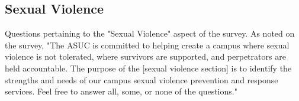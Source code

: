 \documentclass{article}\usepackage[]{graphicx}\usepackage[]{color}
\begin{document}
\subsection{Sexual Violence}
Questions pertaining to the "Sexual Violence" aspect of the survey. As noted on the survey, "The ASUC is committed to helping create a campus where sexual violence is not
tolerated, where survivors are supported, and perpetrators are held accountable.
The purpose of the [sexual violence section] is to identify the strengths and needs of our campus
sexual violence prevention and response services. Feel free to answer all, some,
or none of the questions."
\begin{table}[H]
\centering
{}
\end{table}
\end{document}
